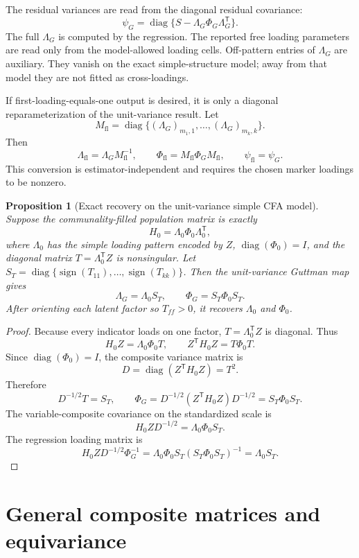 \documentclass[11pt]{article}
\newcommand{\T}{^{\mathsf T}}
\newcommand{\diag}{\operatorname{diag}}
\theoremstyle{plain}
\newtheorem{proposition}{Proposition}
\theoremstyle{remark}
\begin{document}
The residual variances are read from the diagonal residual covariance:
\begin{equation}\label{eq:psiG}
  \psi_G=\diag\{S-\Lambda_G\Phi_G\Lambda_G\T\}.
\end{equation}
The full \(\Lambda_G\) is computed by the regression. The reported free loading
parameters are read only from the model-allowed loading cells. Off-pattern
entries of \(\Lambda_G\) are auxiliary. They vanish on the exact
simple-structure model; away from that model they are not fitted as
cross-loadings.

If first-loading-equals-one output is desired, it is only a diagonal
reparameterization of the unit-variance result. Let
\[
  M_{\mathrm{fl}}
  =
  \diag\{(\Lambda_G)_{m_1,1},\ldots,(\Lambda_G)_{m_k,k}\}.
\]
Then
\[
  \Lambda_{\mathrm{fl}}=\Lambda_GM_{\mathrm{fl}}^{-1},
  \qquad
  \Phi_{\mathrm{fl}}=M_{\mathrm{fl}}\Phi_GM_{\mathrm{fl}},
  \qquad
  \psi_{\mathrm{fl}}=\psi_G .
\]
This conversion is estimator-independent and requires the chosen marker
loadings to be nonzero.

\begin{proposition}[Exact recovery on the unit-variance simple CFA model]\label{prop:recover}
Suppose the communality-filled population matrix is exactly
\[
  H_0=\Lambda_0\Phi_0\Lambda_0\T ,
\]
where \(\Lambda_0\) has the simple loading pattern encoded by \(Z\),
\(\diag(\Phi_0)=I\), and the diagonal matrix \(T=\Lambda_0\T Z\) is
nonsingular. Let \(S_T=\diag\{\operatorname{sign}(T_{11}),\ldots,
\operatorname{sign}(T_{kk})\}\). Then the unit-variance Guttman map gives
\[
  \Lambda_G=\Lambda_0S_T,
  \qquad
  \Phi_G=S_T\Phi_0S_T .
\]
After orienting each latent factor so \(T_{ff}>0\), it recovers
\(\Lambda_0\) and \(\Phi_0\).
\end{proposition}

\begin{proof}
Because every indicator loads on one factor, \(T=\Lambda_0\T Z\) is diagonal.
Thus
\[
  H_0Z=\Lambda_0\Phi_0T,
  \qquad
  Z\T H_0Z=T\Phi_0T .
\]
Since \(\diag(\Phi_0)=I\), the composite variance matrix is
\[
  D=\diag(Z\T H_0Z)=T^2 .
\]
Therefore
\[
  D^{-1/2}T=S_T,
  \qquad
  \Phi_G=D^{-1/2}(Z\T H_0Z)D^{-1/2}=S_T\Phi_0S_T .
\]
The variable-composite covariance on the standardized scale is
\[
  H_0ZD^{-1/2}=\Lambda_0\Phi_0S_T .
\]
The regression loading matrix is
\[
  H_0ZD^{-1/2}\Phi_G^{-1}
  =
  \Lambda_0\Phi_0S_T(S_T\Phi_0S_T)^{-1}
  =
  \Lambda_0S_T .
\]
\end{proof}

\section{General composite matrices and equivariance}
\end{document}
